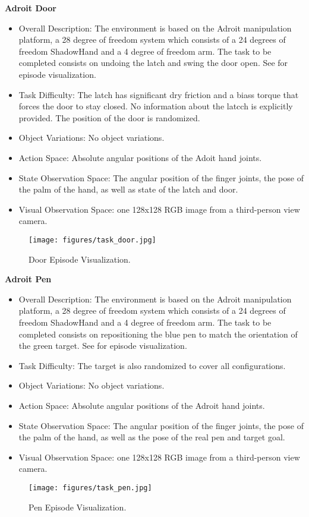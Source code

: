 \textbf{Adroit Door}
\begin{itemize}
    \item Overall Description: The environment is based on the Adroit manipulation platform, a 28 degree of freedom system which consists of a 24 degrees of freedom ShadowHand and a 4 degree of freedom arm. The task to be completed consists on undoing the latch and swing the door open. See  for episode visualization.
    \item Task Difficulty: The latch has significant dry friction and a biass torque that forces the door to stay closed. No information about the latcch is explicitly provided. The position of the door is randomized.
    \item Object Variations: No object variations.
    \item Action Space: Absolute angular positions of the Adoit hand joints.
    \item State Observation Space: The angular position of the finger joints, the pose of the palm of the hand, as well as state of the latch and door.
    \item Visual Observation Space: one 128x128 RGB image from a third-person view camera.
\end{itemize}
\begin{figure}[!ht]
    \centering
    \texttt{[image: figures/task\_door.jpg]}
    \caption{Door Episode Visualization.}
    \label{fig:task_door}
\end{figure}

\textbf{Adroit Pen}
\begin{itemize}
    \item Overall Description: The environment is based on the Adroit manipulation platform, a 28 degree of freedom system which consists of a 24 degrees of freedom ShadowHand and a 4 degree of freedom arm. The task to be completed consists on repositioning the blue pen to match the orientation of the green target. See  for episode visualization.
    \item Task Difficulty: The target is also randomized to cover all configurations.
    \item Object Variations: No object variations.
    \item Action Space: Absolute angular positions of the Adroit hand joints.
    \item State Observation Space: The angular position of the finger joints, the pose of the palm of the hand, as well as the pose of the real pen and target goal.
    \item Visual Observation Space: one 128x128 RGB image from a third-person view camera. 
\end{itemize}
\begin{figure}[!ht]
    \centering
    \texttt{[image: figures/task\_pen.jpg]}
    \caption{Pen Episode Visualization.}
    \label{fig:task_pen}
\end{figure}

